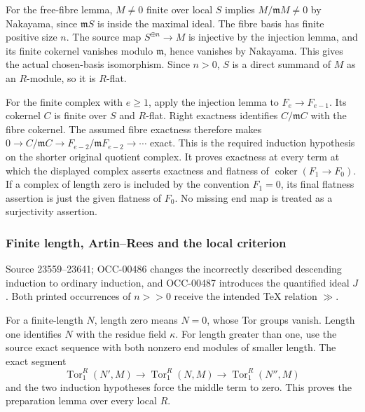 For the free-fibre lemma, \(M\ne0\) finite over local \(S\) implies \(M/\mathfrak mM\ne0\) by Nakayama, since \(\mathfrak mS\) is inside the maximal ideal. The fibre basis has finite positive size \(n\). The source map \(S^{\oplus n}\to M\) is injective by the injection lemma, and its finite cokernel vanishes modulo \(\mathfrak m\), hence vanishes by Nakayama. This gives the actual chosen-basis isomorphism. Since \(n>0\), \(S\) is a direct summand of \(M\) as an \(R\)-module, so it is \(R\)-flat.

For the finite complex with \(e\geq1\), apply the injection lemma to \(F_e\to F_{e-1}\). Its cokernel \(C\) is finite over \(S\) and \(R\)-flat. Right exactness identifies \(C/\mathfrak mC\) with the fibre cokernel. The assumed fibre exactness therefore makes \(0\to C/\mathfrak mC\to F_{e-2}/\mathfrak mF_{e-2}\to\cdots\) exact. This is the required induction hypothesis on the shorter original quotient complex. It proves exactness at every term at which the displayed complex asserts exactness and flatness of \(\operatorname{coker}(F_1\to F_0)\). If a complex of length zero is included by the convention \(F_1=0\), its final flatness assertion is just the given flatness of \(F_0\). No missing end map is treated as a surjectivity assertion.

\subsubsection{Finite length, Artin--Rees and the local criterion}\label{finite-length-artinrees-and-the-local-criterion}

Source 23559--23641; OCC-00486 changes the incorrectly described descending induction to ordinary induction, and OCC-00487 introduces the quantified ideal \(J\). Both printed occurrences of \(n>>0\) receive the intended TeX relation \(\gg\).

For a finite-length \(N\), length zero means \(N=0\), whose Tor groups vanish. Length one identifies \(N\) with the residue field \(\kappa\). For length greater than one, use the source exact sequence with both nonzero end modules of smaller length. The exact segment \[
\operatorname{Tor}_1^R(N',M)\longrightarrow
\operatorname{Tor}_1^R(N,M)\longrightarrow
\operatorname{Tor}_1^R(N'',M)
\] and the two induction hypotheses force the middle term to zero. This proves the preparation lemma over every local \(R\).

